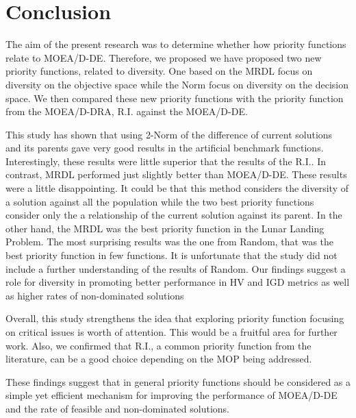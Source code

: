 \section{Conclusion}
The aim of the present research was to determine whether how priority functions relate to MOEA/D-DE. Therefore, we proposed we have proposed two new priority functions, related to diversity. One based on the MRDL focus on diversity on the objective space while the Norm focus on diversity on the decision space. We then compared these new priority functions with the priority function from the MOEA/D-DRA, R.I. against the MOEA/D-DE. 

This study has shown that using 2-Norm of the difference of current solutions and its parents gave very good results in the artificial benchmark functions. Interestingly, these results were little superior that the results of the R.I.. In contrast, MRDL performed just slightly better than MOEA/D-DE. These results were a little disappointing. It could be that this method considers the diversity of a solution against all the population while the two best priority functions consider only the a relationship of the current solution against its parent. In the other hand, the MRDL was the best priority function in the Lunar Landing Problem. The most surprising results was the one from Random, that was the best priority function in few functions. It is unfortunate that the study did not include a further understanding of the results of Random. Our findings suggest a role for diversity in promoting better performance in HV and IGD metrics as well as higher rates of non-dominated solutions 

Overall, this study strengthens the idea that exploring priority function focusing on critical issues is worth of attention. This would be a fruitful area for further work. Also, we confirmed that R.I., a common priority function from the literature, can be a good choice depending on the MOP being addressed. 

These findings suggest that in general priority functions should be considered as a simple yet efficient mechanism for improving the performance of MOEA/D-DE and the rate of feasible and non-dominated solutions. 

